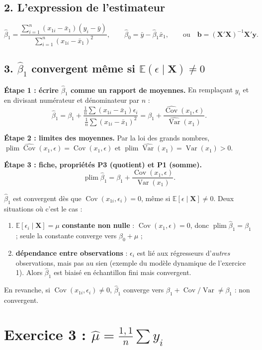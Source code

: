 \documentclass[11pt,a4paper]{article}
\newcommand{\vy}{\mathbf{y}}\newcommand{\vX}{\mathbf{X}}\newcommand{\vb}{\mathbf{b}}\newcommand{\vx}{\mathbf{x}}
\newcommand{\E}{\mathbb{E}}\newcommand{\Var}{\operatorname{Var}}\newcommand{\Cov}{\operatorname{Cov}}
\newcommand{\plim}{\operatorname{plim}}
\newcommand{\sumi}{\sum_{i=1}^{n}}
\begin{document}
\subsection*{2. L'expression de l'estimateur}
\[
\hat\beta_1=\frac{\sumi(x_{1i}-\bar x_1)(y_i-\bar y)}{\sumi(x_{1i}-\bar x_1)^2},\qquad \hat\beta_0=\bar y-\hat\beta_1\bar x_1,\qquad\text{ou}\quad \vb=(\vX'\vX)^{-1}\vX'\vy .
\]

\subsection*{3. $\hat\beta_1$ convergent même si $\E(\epsilon\mid\vX)\neq0$}

\textbf{Étape 1 : écrire $\hat\beta_1$ comme un rapport de moyennes.} En remplaçant $y_i$ et en divisant numérateur et dénominateur par $n$ :
\[
\hat\beta_1=\beta_1+\frac{\frac1n\sum(x_{1i}-\bar x_1)\epsilon_i}{\frac1n\sum(x_{1i}-\bar x_1)^2}
=\beta_1+\frac{\widehat{\Cov}(x_1,\epsilon)}{\widehat{\Var}(x_1)} .
\]

\textbf{Étape 2 : limites des moyennes.} Par la loi des grands nombres, $\plim\widehat{\Cov}(x_1,\epsilon)=\Cov(x_1,\epsilon)$ et $\plim\widehat{\Var}(x_1)=\Var(x_1)>0$.

\textbf{Étape 3 : fiche, propriétés P3 (quotient) et P1 (somme).}
\[
\plim\hat\beta_1=\beta_1+\frac{\Cov(x_1,\epsilon)}{\Var(x_1)} .
\]

\begin{reponse}
$\hat\beta_1$ est convergent dès que $\Cov(x_{1i},\epsilon_i)=0$, même si $\E[\epsilon\mid\vX]\neq0$. Deux situations où c'est le cas :
\begin{enumerate}[nosep]
\item $\E[\epsilon_i\mid\vX]=\mu$ \textbf{constante non nulle} : $\Cov(x_1,\epsilon)=0$, donc $\plim\hat\beta_1=\beta_1$ ; seule la constante converge vers $\beta_0+\mu$ ;
\item \textbf{dépendance entre observations} : $\epsilon_i$ est lié aux régresseurs d'\emph{autres} observations, mais pas au sien (exemple du modèle dynamique de l'exercice 1). Alors $\hat\beta_1$ est biaisé en échantillon fini mais convergent.
\end{enumerate}
En revanche, si $\Cov(x_{1i},\epsilon_i)\neq0$, $\hat\beta_1$ converge vers $\beta_1+\Cov/\Var\neq\beta_1$ : non convergent.
\end{reponse}

\section{Exercice 3 : $\hat\mu=\frac{1{,}1}{n}\sum y_i$}
\end{document}
